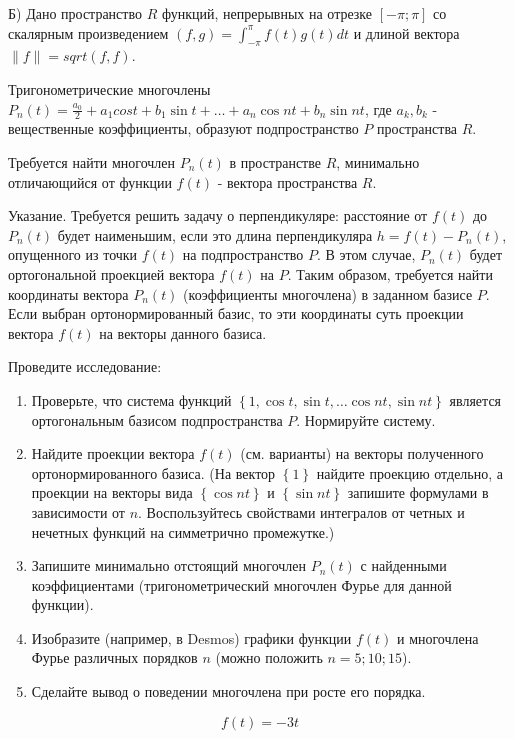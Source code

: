 Б) Дано пространство $R$ функций, непрерывных на отрезке $[-\pi; \pi]$ со скалярным произведением $(f, g) = \int^\pi_{-\pi} f(t)g(t)dt$ и длиной вектора $\|f\| = sqrt{(f, f)}$.

Тригонометрические многочлены $P_n(t) = \frac{a_0}{2} + a_1 cost + b_1 \sin t + \dots + a_n \cos nt + b_n \sin nt$, где $a_k, b_k$ - вещественные коэффициенты,
образуют подпространство $P$ пространства $R$.

Требуется найти многочлен $P_n(t)$ в пространстве $R$, минимально отличающийся от функции $f(t)$ - вектора пространства $R$.

Указание.
Требуется решить задачу о перпендикуляре: расстояние от $f\left(t\right)$ до $P_n\left(t\right)$ будет наименьшим,
если это длина перпендикуляра $h=f\left(t\right)-P_n\left(t\right)$, опущенного из точки $f\left(t\right)$ на подпространство $P$.
В этом случае, $P_n\left(t\right)$ будет ортогональной проекцией вектора $f\left(t\right)$ на $P$.
Таким образом, требуется найти координаты вектора $P_n\left(t\right)$ (коэффициенты многочлена) в заданном базисе $P$.
Если выбран ортонормированный базис, то эти координаты суть проекции вектора $f\left(t\right)$ на векторы данного базиса.

Проведите исследование:
\begin{enumerate}
    \item Проверьте, что система функций $\left\{1,\cos{t},\sin{t},\ldots\cos{n}t,\sin{n}t\right\}$ является ортогональным базисом подпространства $P$. Нормируйте систему.
    \item Найдите проекции вектора $f\left(t\right)$ (см. варианты) на векторы полученного ортонормированного базиса.
    (На вектор $\left\{1\right\}$ найдите проекцию отдельно, а проекции на векторы вида $\left\{\cos{n}t\right\}$ и $\left\{\sin{n}t\right\}$ запишите формулами в зависимости от $n$. Воспользуйтесь свойствами интегралов от четных и нечетных функций на симметрично промежутке.)
    \item Запишите минимально отстоящий многочлен $P_n\left(t\right)$ с найденными коэффициентами (тригонометрический многочлен Фурье для данной функции).
    \item Изобразите (например, в Desmos) графики функции $f\left(t\right)$ и многочлена Фурье различных порядков $n$ (можно положить $n=5;10;15$).
    \item Сделайте вывод о поведении многочлена при росте его порядка.
\end{enumerate}

\[f\left(t\right)=-3t\]

